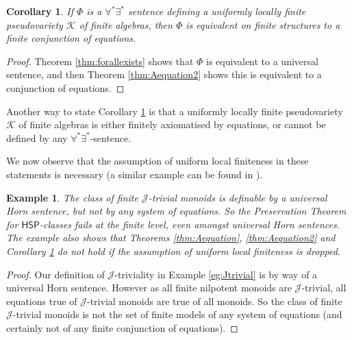 \documentclass[10pt,a4paper]{amsart}
\theoremstyle{plain}
\newtheorem{cor}[thm]{Corollary}
\newtheorem{eg}[thm]{Example}
\theoremstyle{definition}
\begin{document}
\begin{cor}\label{cor:compton}
If $\Phi$ is a $\forall^*\exists^*$ sentence defining a uniformly locally finite pseudovariety $\mathscr{K}$ of finite algebras, 
then $\Phi$ is equivalent on finite structures to a finite conjunction of equations.
\end{cor}
\begin{proof}
Theorem \ref{thm:forallexists} shows that $\Phi$ is equivalent to a universal sentence, and then Theorem  \ref{thm:Aequation2} shows this is equivalent to a conjunction of equations.
\end{proof}
Another way to state Corollary \ref{cor:compton} is that a uniformly locally finite pseudovariety~$\mathscr{K}$ of finite algebras is either finitely axiomatised by equations, or cannot be defined by any $\forall^*\exists^*$-sentence.


We now observe that the assumption of uniform local finiteness in these statements is necessary (a similar example can be found in \cite{rosen}).
\begin{eg}\label{eg:Jtrivial2}
The class of finite $\mathcal{J}$-trivial monoids is definable by a universal Horn sentence, but not by any system of equations.  So the Preservation Theorem for $\mathsf{HSP}$-classes fails at the finite level, even amongst universal Horn sentences.  The example also shows that Theorems \ref{thm:Aequation}, \ref{thm:Aequation2} and Corollary \ref{cor:compton} do not hold if the assumption of uniform local finiteness is dropped.
\end{eg}
\begin{proof}
Our definition of $\mathcal{J}$-triviality in Example \ref{eg:Jtrivial} is by way of a universal Horn sentence.  However as all finite nilpotent monoids are $\mathcal{J}$-trivial, all equations true of $\mathcal{J}$-trivial monoids are true of all monoids.  So the class of finite $\mathcal{J}$-trivial monoids is not the set of finite models of any system of equations (and certainly not of any finite conjunction of equations).
\end{proof}
\end{document}
